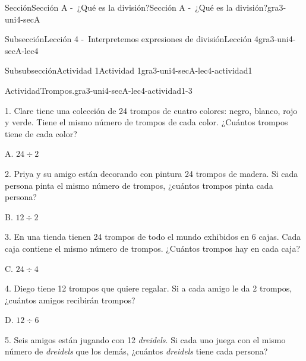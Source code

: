 \documentclass[twoside,10pt,]{article}
\begin{document}
\begin{sectionptx}{Sección}{Sección A -~¿Qué es la división?}{}{Sección A -~¿Qué es la división?}{}{}{gra3-uni4-secA}
\begin{subsectionptx}{Subsección}{Lección 4 -~Interpretemos expresiones de división}{}{Lección 4}{}{}{gra3-uni4-secA-lec4}
\begin{subsubsectionptx}{Subsubsección}{Actividad 1}{}{Actividad 1}{}{}{gra3-uni4-secA-lec4-actividad1}
\begin{activity}{Actividad}{Trompos.}{gra3-uni4-secA-lec4-actividad1-3}
\begin{sidebyside}{2}{0.05}{0}{0.15}
\begin{sbspanel}{0.6}
1. Clare tiene una colección de 24 trompos de cuatro colores: negro, blanco, rojo y verde. Tiene el mismo número de trompos de cada color. ¿Cuántos trompos tiene de cada color?%
\end{sbspanel}%
\begin{sbspanel}{0.2}%
\par
A. \(24 \div 2\)%
\end{sbspanel}%
\end{sidebyside}%
\begin{sidebyside}{2}{0.05}{0}{0.15}%
\begin{sbspanel}{0.6}%
2. Priya y su amigo están decorando con pintura 24 trompos de madera. Si cada persona pinta el mismo número de trompos, ¿cuántos trompos pinta cada persona?%
\end{sbspanel}%
\begin{sbspanel}{0.2}%
\par
B. \(12 \div 2\)%
\end{sbspanel}%
\end{sidebyside}%
\begin{sidebyside}{2}{0.05}{0}{0.15}%
\begin{sbspanel}{0.6}%
3. En una tienda tienen 24 trompos de todo el mundo exhibidos en 6 cajas. Cada caja contiene el mismo número de trompos. ¿Cuántos trompos hay en cada caja?%
\end{sbspanel}%
\begin{sbspanel}{0.2}%
\par
C. \(24 \div 4\)%
\end{sbspanel}%
\end{sidebyside}%
\begin{sidebyside}{2}{0.05}{0}{0.15}%
\begin{sbspanel}{0.6}%
4. Diego tiene 12 trompos que quiere regalar. Si a cada amigo le da 2 trompos, ¿cuántos amigos recibirán trompos?%
\end{sbspanel}%
\begin{sbspanel}{0.2}%
\par
D. \(12 \div 6\)%
\end{sbspanel}%
\end{sidebyside}%
\begin{sidebyside}{2}{0.05}{0}{0.15}%
\begin{sbspanel}{0.6}%
5. Seis amigos están jugando con 12 \emph{dreidels}. Si cada uno juega con el mismo número de \emph{dreidels} que los demás, ¿cuántos \emph{dreidels} tiene cada persona?%
\end{sbspanel}%
\begin{sbspanel}{0.2}%

\end{sbspanel}
\end{sidebyside}
\end{activity}
\end{subsubsectionptx}
\end{subsectionptx}
\end{sectionptx}
\end{document}
